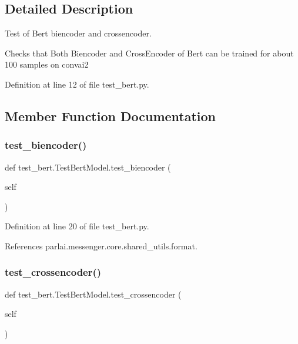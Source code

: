 \subsection{Detailed Description}
\begin{DoxyVerb}Test of Bert biencoder and crossencoder.

Checks that Both Biencoder and CrossEncoder of Bert can be trained
for about 100 samples on convai2
\end{DoxyVerb}
 

Definition at line 12 of file test\+\_\+bert.\+py.



\subsection{Member Function Documentation}
\mbox{\label{classtest__bert_1_1TestBertModel_a58a6c62d3ef3009a203c407feea4852b}} 
\subsubsection{\texorpdfstring{test\+\_\+biencoder()}{test\_biencoder()}}
{\footnotesize\ttfamily def test\+\_\+bert.\+Test\+Bert\+Model.\+test\+\_\+biencoder (\begin{DoxyParamCaption}\item[{}]{self }\end{DoxyParamCaption})}



Definition at line 20 of file test\+\_\+bert.\+py.



References parlai.\+messenger.\+core.\+shared\+\_\+utils.\+format.

\mbox{\label{classtest__bert_1_1TestBertModel_a1576f491a7c638f37d3e5e3317478931}} 
\subsubsection{\texorpdfstring{test\+\_\+crossencoder()}{test\_crossencoder()}}
{\footnotesize\ttfamily def test\+\_\+bert.\+Test\+Bert\+Model.\+test\+\_\+crossencoder (\begin{DoxyParamCaption}\item[{}]{self }\end{DoxyParamCaption})}



